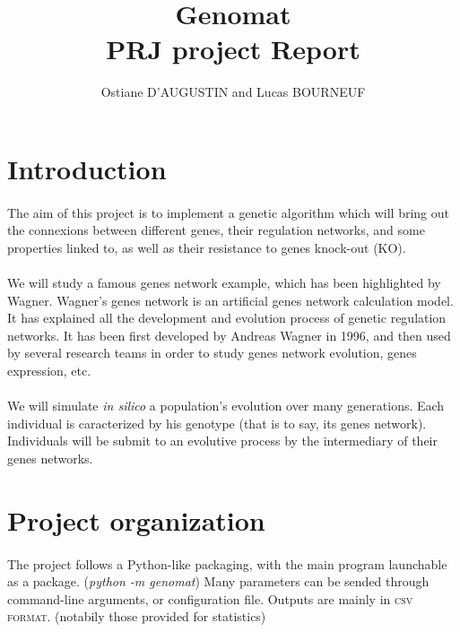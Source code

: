 \documentclass[]{report} %
\title{Genomat\\PRJ project Report}
\author{Ostiane D'AUGUSTIN and Lucas BOURNEUF}
\date{}
\begin{document}
        \maketitle %




\section*{Introduction}
	\paragraph*{}
	The aim of this project is to implement a genetic algorithm which will bring out the connexions between different genes, 
        their regulation networks, and some properties linked to, as well as their resistance to genes knock-out (KO).
	\paragraph*{}
	We will study a famous genes network example, which has been highlighted by Wagner. Wagner's genes network is an artificial genes network calculation model. 
        It has explained all the development and evolution process of genetic regulation networks. It has been first developed by Andreas Wagner in 1996, 
        and then used by several research teams in order to study genes network evolution, genes expression, etc.
	\paragraph*{}
	We will simulate \textit{in silico} a population's evolution over many generations. Each individual is caracterized by his genotype 
        (that is to say, its genes network). 
        Individuals will be submit to an evolutive process by the intermediary of their genes networks.




\section*{Project organization}
	\paragraph*{}
        The project follows a Python-like packaging, with the main program launchable as a package. (\textit{python -m genomat})
        Many parameters can be sended through command-line arguments, or configuration file.
        Outputs are mainly in \textsc{csv format}. (notabily those provided for statistics)
\end{document}
